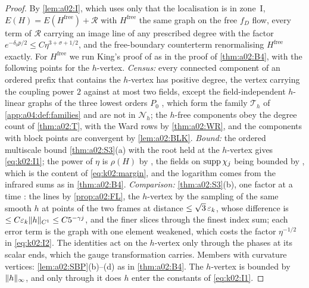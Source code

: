 \begin{proof}
By \cref{lem:a02:I}, which uses only that the localisation is in zone~I, $E(H)=E(H^{\mathrm{free}})+\mathcal R$ with $H^{\mathrm{free}}$ the same graph on the free $f_D$ flow, every term of $\mathcal R$ carrying an image line of any prescribed degree with the factor $e^{-\delta_0p/2}\le C\eta^{3+\sigma+1/2}$, and the free-boundary counterterm renormalising $H^{\mathrm{free}}$ exactly. For $H^{\mathrm{free}}$ we run King's proof of \cite[Thm.~3.5, Prop.~3.6]{K1} as in the proof of \cref{thm:a02:B4}, with the following points for the $h$-vertex. \emph{Census:} every connected component of an ordered prefix that contains the $h$-vertex has positive degree, the vertex \cite[(3.21)]{K1} carrying the coupling power $2$ against at most two fields, except the field-independent $h$-linear graphs of the three lowest orders $P_0$ \cite[Thm.~3.5]{K1}, which form the family $\mathcal T_h$ of \cref{app:a04:def:families} and are not in $\mathcal N_h$; the $h$-free components obey the degree count of \cref{thm:a02:T}, with the Ward rows by \cref{thm:a02:WR}, and the components with block points are convergent by \cref{lem:a02:BLK}. \emph{Bound:} the ordered multiscale bound \cref{thm:a02:S3}(a) with the root held at the $h$-vertex gives \eqref{eq:k02:I1}; the power of $\eta$ is $\rho(H)$ by \cite[p.~665]{K1}, the fields on $\operatorname{supp}\chi_j$ being bounded by \cite[(3.2)]{K1}, which is the content of \eqref{eq:k02:margin}, and the logarithm comes from the infrared sums as in \cref{thm:a02:B4}. \emph{Comparison:} \cref{thm:a02:S3}(b), one factor at a time \cite[pp.~663--665]{K1}: the lines by \cref{prop:a02:FL}, the $h$-vertex by the sampling of the same smooth $h$ at points of the two frames at distance $\le\sqrt3\,\varepsilon_k$, whose difference is $\le C\varepsilon_k\lVert h\rVert_{C^1}\le C5^{-\gamma j}$, and the finer slices through the finest index sum; each error term is the graph with one element weakened, which costs the factor $\eta^{-1/2}$ in \eqref{eq:k02:I2}. The identities \cite[(3.43)--(3.55)]{K1} act on the $h$-vertex only through the phases at its scalar ends, which the gauge transformation \cite[(3.46)]{K1} carries. Members with curvature vertices: \cref{lem:a02:SBP}(b)--(d) as in \cref{thm:a02:B4}. The $h$-vertex is bounded by $\lVert h\rVert_\infty$, and only through it does $h$ enter the constants of \eqref{eq:k02:I1}.
\end{proof}

